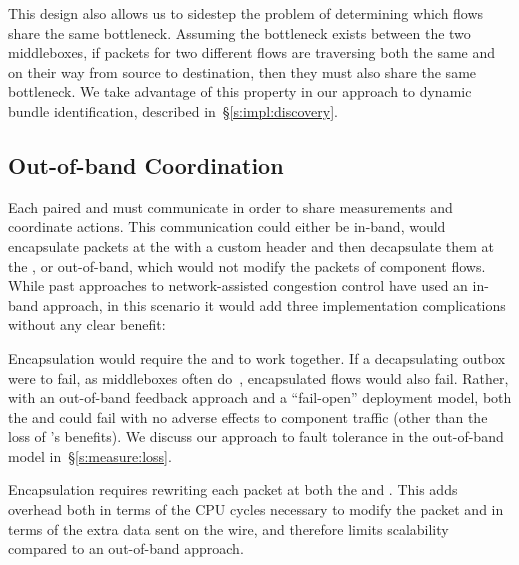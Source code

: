 
This design also allows us to sidestep the problem of determining which flows share the same bottleneck.
Assuming the bottleneck exists between the two middleboxes, if packets for two different flows are traversing both the same \inbox and \outbox on their way from source to destination, then they must also share the same bottleneck. 
We take advantage of this property in our approach to dynamic bundle identification, described in~\S\ref{s:impl:discovery}.

%
\subsection{Out-of-band Coordination}\label{s:design:oob}
Each paired \inbox and \outbox must communicate in order to share measurements and coordinate actions. 
This communication could either be in-band, \ie would encapsulate packets
at the \inbox with a custom header and then decapsulate them at the \outbox, or out-of-band,
which would not modify the packets of component flows.
While past approaches to network-assisted congestion control have used an in-band approach, in this scenario it would add three implementation complications without any clear benefit:

 Encapsulation would require the \inbox and \outbox to work together. 
If a decapsulating outbox were to fail, as middleboxes often do~\cite{aplomb}, encapsulated flows would also fail.
Rather, with an out-of-band feedback approach and a ``fail-open'' deployment model, both the \inbox and \outbox could fail with no adverse effects to component traffic (other than the loss of \name's benefits). We discuss our approach to fault tolerance in the out-of-band model in~\S\ref{s:measure:loss}.

 Encapsulation requires rewriting each packet at both the \inbox and \outbox. 
This adds overhead both in terms of the CPU cycles necessary to modify the packet and in terms of the extra data sent on the wire, and therefore limits scalability compared to an out-of-band approach. 

